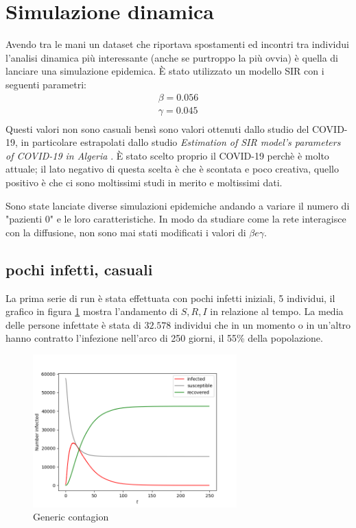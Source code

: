 \documentclass[a4paper]{article}
\begin{document}
\section{Simulazione dinamica}
Avendo tra le mani un dataset che riportava spostamenti ed incontri tra individui l'analisi dinamica più interessante (anche se purtroppo la più ovvia) è quella di lanciare una simulazione epidemica.
È stato utilizzato un modello SIR con i seguenti parametri:
\begin{align*}
\beta = 0.056\\
\gamma = 0.045\\
\end{align*}
Questi valori non sono casuali bensì sono valori ottenuti dallo studio del COVID-19, in particolare estrapolati dallo studio \textit{Estimation of SIR model’s parameters of COVID-19 in Algeria} \cite{covid}.
È stato scelto proprio il COVID-19 perchè è molto attuale; il lato negativo di questa scelta è che è scontata e poco creativa, quello positivo è che ci sono moltissimi studi in merito e moltissimi dati.


Sono state lanciate diverse simulazioni epidemiche andando a variare il numero di "pazienti 0" e le loro caratteristiche.
In modo da studiare come la rete interagisce con la diffusione, non sono mai stati modificati i valori di $\beta e \gamma$.\\

\subsection{pochi infetti, casuali}
La prima serie di run è stata effettuata con pochi infetti iniziali, 5 individui, il grafico in figura \ref{FIG:generic} mostra l'andamento di $S, R, I$ in relazione al tempo.
La media delle persone infettate è stata di $32.578$ individui che in un momento o in un'altro hanno contratto l'infezione nell'arco di 250 giorni, il 55\% della popolazione.\\
\begin{figure}[!ht]
\centering
\includegraphics[width=0.7\textwidth]{generic_run.png}
\caption{Generic contagion} \label{FIG:generic}
\end{figure}
\newpage
\end{document}
